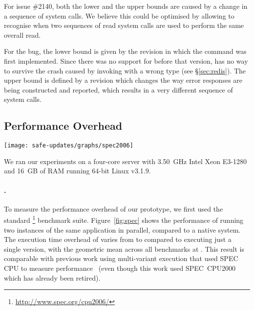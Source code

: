 For \lighttpd issue \#2140, both the lower and the upper bounds are
caused by a change in a sequence of  system calls.  We
believe this could be optimised by allowing \mx to recognise when two
sequences of read system calls are used to perform the same overall
read.


For the \redis bug, the lower bound is given by the revision in which the
 command was first implemented.  Since there was no support for
 before that version, \mx has no way to survive the crash caused
by invoking  with a wrong type (see \S\ref{sec:redis}).  The
upper bound is defined by a revision which changes the way error responses are
being constructed and reported, which results in a very different sequence of
system calls.



\subsection{Performance Overhead}
\label{sec:performance}

\begin{figure*}[!t]
\centering
\texttt{[image: safe-updates/graphs/spec2006]}
\caption{Normalised execution times for the \spec benchmark suite running under
\mx.}
\label{fig:spec}
\end{figure*}

We ran our experiments on a four-core server with 3.50~GHz Intel
Xeon E3-1280 and 16~GB of RAM running 64-bit Linux v3.1.9.

\paragraph{\spec.}
To measure the performance overhead of our prototype, we first used
the standard \spec\footnote{\url{http://www.spec.org/cpu2006/}}
benchmark suite.  Figure~\ref{fig:spec} shows the performance of \mx
running two instances of the same application in parallel, compared to
a native system. The execution time overhead of \mx varies
from \minOverSPEC to \maxOverSPEC compared to executing just a single
version, with the geometric mean across all \numSPECbench benchmarks at
\avgOverSPEC. This result is comparable with previous work using multi-variant
execution that used SPEC CPU to measure performance~\cite{orchestra09} (even
though this work used SPEC~CPU2000 which has already been retired).

